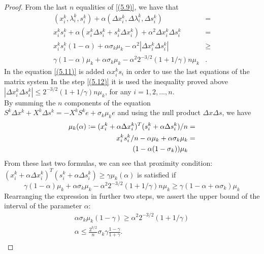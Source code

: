 \documentclass[a4paper,10 pt,titlepage,twoside]{book}
\theoremstyle{plain}
\theoremstyle{definition}
\theoremstyle{remark}
\begin{document}
\begin{proof}
	From the last $n$ equalities of \ref{(5.9)}, we have that 
	\begin{align}(x_{i}^{k}, \lambda_{i}^{k}, s_{i}^{k})+\alpha(\Delta x_{i}^{k},\Delta \lambda_{i}^{k},\Delta s_{i}^{k}) &=\\ 
	x_{i}^{k}s_{i}^{k} + \alpha(x_{i}^{k} \Delta s_{i}^{k} + s_{i}^{k} \Delta x_{i}^{k})+\alpha^{2}\Delta x_{i}^{k} \Delta s_{i}^{k} &=\\
	x_{i}^{k}s_{i}^{k}(1 - \alpha) + \alpha \sigma_{k}\mu_{k}-\alpha^{2}|\Delta x_{i}^{k} \Delta s_{i}^{k}| &\geq\label{(5.11)}\\
	\gamma(1 - \alpha)\mu_{k} + \alpha \sigma_{k}\mu_{k}-\alpha^{2}2^{-3/2}(1 + 1/\gamma)n\mu_{k} &\label{(5.12)}.
	\end{align}
	In the equation \ref{(5.11)} is added $\alpha x_{i}^{k}s_{i}$ in order to use the last equations of the matrix system 
	In the step \ref{(5.12)} it is used the inequality proved above $|\Delta x_{i}^{k}\Delta s_{i}^{k}|\leq2^{-3/2}(1 + 1/\gamma)n\mu_{k}$, for any $i = 1,2,...,n$. \\
	By summing the $n$ components of the equation $S^{k}\Delta x^{k} + X^{k} \Delta s^{k} = -X^{k}S^{k}e + \sigma_{k} \mu_{k}e$ and using the null product $\Delta x \Delta s$, we have
	\begin{align*}\mu_{k}(\alpha)\vcentcolon=(x_{i}^{k} + \alpha\Delta x_{i}^{k})^{T}(s_{i}^{k} + \alpha\Delta s_{i}^{k})/n&=\\ 
	x_{i}^{k}s_{i}^{k}/n - \alpha \mu_{k}+\alpha \sigma_{k} \mu_{k} &=\\
	(1-\alpha(1-\sigma_{k}))\mu_{k}
	\end{align*}
	From these last two formulas, we can see that proximity condition:\\$(x_{i}^{k} + \alpha\Delta x_{i}^{k})^{T}(s_{i}^{k} + \alpha\Delta s_{i}^{k}) \geq \gamma\mu_{k}(\alpha)$ is satisfied if \begin{equation*}
		\gamma(1-\alpha)\mu_{k} + \alpha\sigma_{k}\mu_{k} - \alpha^{2}2^{-3/2}(1 + 1/\gamma)n\mu_{k}\geq \gamma(1 - \alpha +\alpha\sigma_{k})\mu_{k}
		\end{equation*}
		Rearranging the expression in further two steps, we assert the upper bound of the interval of the parameter $\alpha$:
		\begin{align*}
		\alpha\sigma_{k}\mu_{k}(1-\gamma)\geq\alpha^{2}2^{-3/2}(1+1/\gamma)\\
		\alpha \leq \frac{2^{3/2}}{n} \sigma_{k}\gamma\frac{1-\gamma}{1+\gamma}.\\		
		\end{align*}

\end{proof}
\end{document}
